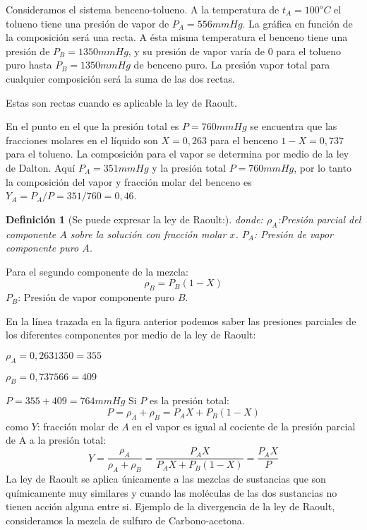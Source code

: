 \documentclass[11pt,openany]{book}
\newtheorem{defi}{Definición}
\begin{document}
 Consideramos el sistema benceno-tolueno. A la temperatura de $t_A=100^oC$ el tolueno tiene una presión 
 de vapor de $P_A=556mmHg$. La gráfica en función de la composición será una recta. A ésta misma 
 temperatura el benceno tiene una presión de $P_B=1350 mmHg$, y su presión de vapor varía de 0 para el
  tolueno puro hasta $P_B=1350 mmHg$ de benceno puro. La presión vapor total para cualquier composición será 
  la suma de las dos rectas.

  Estas son rectas cuando es aplicable la ley de Raoult.

  En el punto en el que la presión total es $P=760 mmHg$ se encuentra que las fracciones molares en 
  el líquido son $X=0,263$ para el benceno $1-X=0,737$ para el tolueno. La composición para el vapor se 
  determina por medio de la ley de Dalton. Aquí $P_A=351 mmHg$ y la presión total $P=760 mmHg$, por lo tanto la 
  composición del vapor y fracción molar del benceno es $Y_A=P_A/P=351/760=0,46$.
  
 \begin{defi}[{Se puede expresar la ley de Raoult:}]
  donde:
  $\rho_A$:Presión parcial del componente $A$ sobre la solución con fracción molar $x$.  
  $P_A$: Presión de vapor componente puro $A$.
\end{defi}

  Para el segundo componente de la mezcla:
   \begin{equation}
   \boxed{\rho_B=P_B (1-X)}
   \end{equation}
  $P_B$: Presión de vapor componente puro $B$.

En la línea trazada en la figura anterior podemos saber las presiones parciales de los diferentes
 componentes por medio de la ley de Raoult:

$\rho_A=0,263 1350 = 355$

$\rho_B= 0,737 566 = 409$

$P = 355 + 409 = 764 mmHg$ 
Si $P$ es la presión total:
\begin{equation}
\boxed{P=\rho_A + \rho_B = P_A X+P_B (1-X)}
\end{equation}
como $Y$: fracción molar de $A$ en el vapor es igual al cociente de la presión parcial de A a la presión total:
\begin{equation}
\boxed{Y=\frac{\rho_A}{\rho_A+\rho_B}=\frac{P_A X}{P_A X+P_B (1-X)}=\frac{P_A X}{P}}
\end{equation}
La ley de Raoult se aplica únicamente a las mezclas de sustancias que son químicamente muy similares 
y cuando las moléculas de las dos sustancias no tienen acción alguna entre si. Ejemplo de la 
divergencia de la ley de Raoult, consideramos la mezcla de sulfuro de Carbono-acetona.
\end{document}
